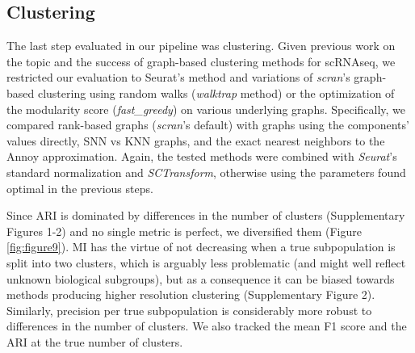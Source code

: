 \documentclass{bmcart}
\begin{document}
\subsection*{Clustering}

The last step evaluated in our pipeline was clustering. Given previous work on the topic \cite{duoClustering2018,freytagComparison2018} and the success of graph-based clustering methods for scRNAseq, we restricted our evaluation to Seurat's method and variations of \textit{scran}'s graph-based clustering using random walks (\textit{walktrap} method) or the optimization of the modularity score (\textit{fast\_greedy}) on various underlying graphs. Specifically, we compared rank-based graphs (\textit{scran}'s default) with graphs using the components' values directly, SNN vs KNN graphs, and the exact nearest neighbors to the Annoy approximation. Again, the tested methods were combined with \textit{Seurat}'s standard normalization and \textit{SCTransform}, otherwise using the parameters found optimal in the previous steps. 

Since ARI is dominated by differences in the number of clusters (Supplementary Figures 1-2) and no single metric is perfect, we diversified them (Figure \ref{fig:figure9}). MI has the virtue of not decreasing when a true subpopulation is split into two clusters, which is arguably less problematic (and might well reflect unknown biological subgroups), but as a consequence it can be biased towards methods producing higher resolution clustering (Supplementary Figure 2). Similarly, precision per true subpopulation is considerably more robust to differences in the number of clusters. We also tracked the mean F1 score and the ARI at the true number of clusters. 
\end{document}

